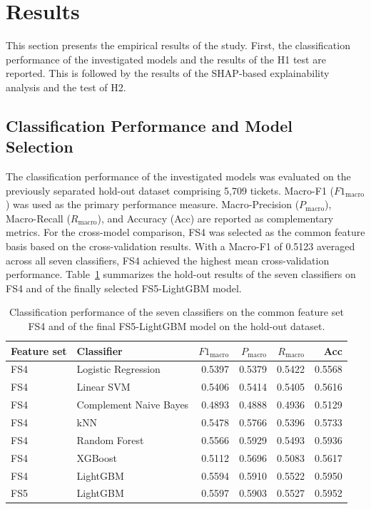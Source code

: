 \section{Results}

This section presents the empirical results of the study. First, the
classification performance of the investigated models and the results of the
H1 test are reported. This is followed by the results of the SHAP-based
explainability analysis and the test of H2.

\subsection{Classification Performance and Model Selection}

The classification performance of the investigated models was evaluated on
the previously separated hold-out dataset comprising 5,709 tickets. Macro-F1
($F1_{\mathrm{macro}}$) was used as the primary performance measure.
Macro-Precision ($P_{\mathrm{macro}}$), Macro-Recall
($R_{\mathrm{macro}}$), and Accuracy (Acc) are reported as complementary
metrics. For the cross-model comparison, FS4 was selected as the common
feature basis based on the cross-validation results. With a Macro-F1 of
0.5123 averaged across all seven classifiers, FS4 achieved the highest mean
cross-validation performance. Table~\ref{tab:holdout_performance} summarizes
the hold-out results of the seven classifiers on FS4 and of the finally
selected FS5-LightGBM model.

\begin{table}[ht]
    \centering
    \caption{Classification performance of the seven classifiers on the common
    feature set FS4 and of the final FS5-LightGBM model on the hold-out dataset.}
    \label{tab:holdout_performance}
    \begin{tabular}{llrrrr}
        \toprule
        Feature set & Classifier & $F1_{\mathrm{macro}}$ &
        $P_{\mathrm{macro}}$ & $R_{\mathrm{macro}}$ & Acc \\
        \midrule
        FS4 & Logistic Regression    & 0.5397 & 0.5379 & 0.5422 & 0.5568 \\
        FS4 & Linear SVM             & 0.5406 & 0.5414 & 0.5405 & 0.5616 \\
        FS4 & Complement Naive Bayes & 0.4893 & 0.4888 & 0.4936 & 0.5129 \\
        FS4 & kNN                    & 0.5478 & 0.5766 & 0.5396 & 0.5733 \\
        FS4 & Random Forest          & 0.5566 & 0.5929 & 0.5493 & 0.5936 \\
        FS4 & XGBoost                & 0.5112 & 0.5696 & 0.5083 & 0.5617 \\
        FS4 & LightGBM               & 0.5594 & 0.5910 & 0.5522 & 0.5950 \\
        FS5 & LightGBM               & 0.5597 & 0.5903 & 0.5527 & 0.5952 \\
        \bottomrule
    \end{tabular}
\end{table}


